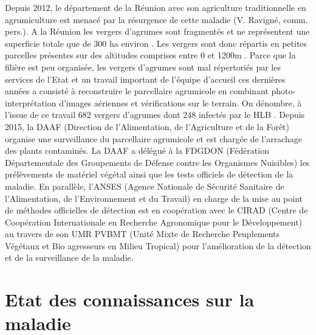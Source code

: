 \documentclass[
  11pt,
  french,
  a4paper,
  extrafontsizes,onecolumn,openright
  ]{memoir}
\begin{document}
Depuis 2012, le département de la Réunion avec son agriculture traditionnelle en agrumiculture est menacé par la résurgence de cette maladie (V. Ravigné, comm. pers.). A la Réunion les vergers d'agrumes sont fragmentés et ne représentent une superficie totale que de 300 ha environ \autocite{leung_production_2014}. Les vergers sont donc répartis en petites parcelles présentes sur des altitudes comprises entre 0 et 1200m \autocite{guilloteau_utilisation_2018}. Parce que la filière est peu organisée, les vergers d'agrumes sont mal répertoriés par les services de l'Etat et un travail important de l'équipe d'accueil ces dernières années a consisté à reconstruire le parcellaire agrumicole en combinant photo-interprétation d'images aériennes et vérifications sur le terrain. On dénombre, à l'issue de ce travail 682 vergers d'agrumes dont 248 infectés par le HLB \autocite{guilloteau_utilisation_2018}.
Depuis 2015, la DAAF (Direction de l'Alimentation, de l'Agriculture et de la Forêt) organise une surveillance du parcellaire agrumicole et est chargée de l'arrachage des plants contaminés. La DAAF a délégué à la FDGDON (Fédération Départementale des Groupements de Défense contre les Organismes Nuisibles) les prélèvements de matériel végétal ainsi que les tests officiels de détection de la maladie. En parallèle, l'ANSES (Agence Nationale de Sécurité Sanitaire de l'Alimentation, de l'Environnement et du Travail) en charge de la mise au point de méthodes officielles de détection est en coopération avec le CIRAD (Centre de Coopération Internationale en Recherche Agronomique pour le Développement) au travers de son UMR PVBMT (Unité Mixte de Recherche Peuplements Végétaux et Bio agresseurs en Milieu Tropical) pour l'amélioration de la détection et de la surveillance de la maladie.

\vfill
\newpage

\hypertarget{etat-des-connaissances-sur-la-maladie}{%
\section{Etat des connaissances sur la maladie}\label{etat-des-connaissances-sur-la-maladie}}
\end{document}
